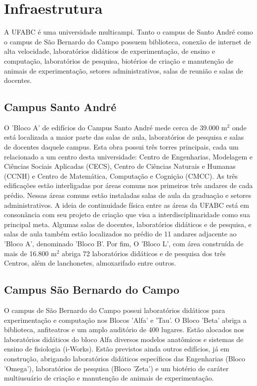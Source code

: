 \section {Infraestrutura}

A UFABC é uma universidade multicampi. Tanto o campus de Santo André como o campus de São Bernardo do Campo possuem biblioteca, conexão de internet de alta velocidade, laboratórios didáticos de experimentação, de ensino e computação, laboratórios de pesquisa, biotérios de criação e manutenção de animais de experimentação, setores administrativos, salas de reunião e salas de docentes.

\subsection{Campus Santo André}

O 'Bloco A' de edifícios do Campus Santo André mede cerca de 39.000 m$^2$ onde está localizada a maior parte das salas de aula, laboratórios de pesquisa e salas de docentes daquele campus. Esta obra possui três torres principais, cada um relacionado a um centro desta universidade: Centro de Engenharias, Modelagem e Ciências Sociais Aplicadas (CECS), Centro de Ciências Naturais e Humanas (CCNH) e Centro de Matemática, Computação e Cognição (CMCC). As três edificações estão interligadas por áreas comuns nos primeiros três andares de cada prédio. Nessas áreas comuns estão instaladas salas de aula da graduação e setores administrativos. A ideia de continuidade física entre as áreas da UFABC está em consonância com seu projeto de criação que visa a interdisciplinaridade como sua principal meta. Algumas salas de docentes, laboratórios didáticos e de pesquisa, e salas de aula também estão localizados no prédio de 11 andares adjacente ao 'Bloco A', denominado 'Bloco B'. Por fim, O 'Bloco L', com área construída de mais de 16.800 m$^2$ abriga 72 laboratórios didáticos e de pesquisa dos três Centros, além de lanchonetes, almoxarifado entre outros.

\subsection{Campus São Bernardo do Campo} 

O campus de São Bernardo do Campo possui laboratórios didáticos para experimentação e computação nos Blocos 'Alfa' e 'Tau'. O Bloco 'Beta' abriga a biblioteca, anfiteatros e um amplo auditório de 400 lugares. Estão alocados nos laboratórios didáticos do bloco Alfa diversos modelos anatômicos e sistemas de ensino de fisiologia (i-Works). Estão previstos ainda outros edifícios, já em construção, abrigando laboratórios didáticos específicos das Engenharias (Bloco 'Omega'), laboratórios de pesquisa (Bloco 'Zeta') e um biotério de caráter multiusuário de criação e manutenção de animais de experimentação.

